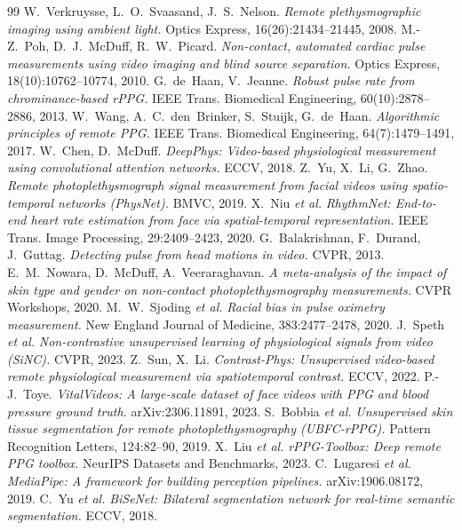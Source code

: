 \documentclass[11pt]{article}
\begin{document}
\begin{thebibliography}{99}
\small
{} W.~Verkruysse, L.~O.~Svaasand, J.~S.~Nelson.
  \emph{Remote plethysmographic imaging using ambient light.} Optics Express,
  16(26):21434--21445, 2008.
 M.-Z.~Poh, D.~J.~McDuff, R.~W.~Picard.
  \emph{Non-contact, automated cardiac pulse measurements using video imaging and
  blind source separation.} Optics Express, 18(10):10762--10774, 2010.
 G.~de~Haan, V.~Jeanne.
  \emph{Robust pulse rate from chrominance-based rPPG.} IEEE Trans. Biomedical
  Engineering, 60(10):2878--2886, 2013.
 W.~Wang, A.~C.~den~Brinker, S.~Stuijk, G.~de~Haan.
  \emph{Algorithmic principles of remote PPG.} IEEE Trans. Biomedical Engineering,
  64(7):1479--1491, 2017.
 W.~Chen, D.~McDuff.
  \emph{DeepPhys: Video-based physiological measurement using convolutional
  attention networks.} ECCV, 2018.
 Z.~Yu, X.~Li, G.~Zhao.
  \emph{Remote photoplethysmograph signal measurement from facial videos using
  spatio-temporal networks (PhysNet).} BMVC, 2019.
 X.~Niu \emph{et al.}
  \emph{RhythmNet: End-to-end heart rate estimation from face via spatial-temporal
  representation.} IEEE Trans. Image Processing, 29:2409--2423, 2020.
 G.~Balakrishnan, F.~Durand, J.~Guttag.
  \emph{Detecting pulse from head motions in video.} CVPR, 2013.
 E.~M.~Nowara, D.~McDuff, A.~Veeraraghavan.
  \emph{A meta-analysis of the impact of skin type and gender on non-contact
  photoplethysmography measurements.} CVPR Workshops, 2020.
 M.~W.~Sjoding \emph{et al.}
  \emph{Racial bias in pulse oximetry measurement.} New England Journal of Medicine,
  383:2477--2478, 2020.
 J.~Speth \emph{et al.}
  \emph{Non-contrastive unsupervised learning of physiological signals from video
  (SiNC).} CVPR, 2023.
 Z.~Sun, X.~Li.
  \emph{Contrast-Phys: Unsupervised video-based remote physiological measurement via
  spatiotemporal contrast.} ECCV, 2022.
 P.-J.~Toye.
  \emph{VitalVideos: A large-scale dataset of face videos with PPG and blood pressure
  ground truth.} arXiv:2306.11891, 2023.
 S.~Bobbia \emph{et al.}
  \emph{Unsupervised skin tissue segmentation for remote photoplethysmography
  (UBFC-rPPG).} Pattern Recognition Letters, 124:82--90, 2019.
 X.~Liu \emph{et al.}
  \emph{rPPG-Toolbox: Deep remote PPG toolbox.} NeurIPS Datasets and Benchmarks, 2023.
 C.~Lugaresi \emph{et al.}
  \emph{MediaPipe: A framework for building perception pipelines.} arXiv:1906.08172,
  2019.
 C.~Yu \emph{et al.}
  \emph{BiSeNet: Bilateral segmentation network for real-time semantic segmentation.}
  ECCV, 2018.
\end{thebibliography}
\end{document}
